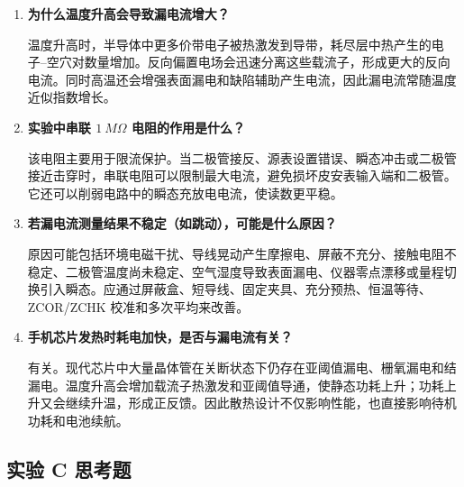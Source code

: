 \documentclass[11pt]{article}
\begin{document}
\begin{enumerate}
    \item \textbf{为什么温度升高会导致漏电流增大？}

    温度升高时，半导体中更多价带电子被热激发到导带，耗尽层中热产生的电子--空穴对数量增加。反向偏置电场会迅速分离这些载流子，形成更大的反向电流。同时高温还会增强表面漏电和缺陷辅助产生电流，因此漏电流常随温度近似指数增长。

    \item \textbf{实验中串联 $\SI{1}{M\Omega}$ 电阻的作用是什么？}

    该电阻主要用于限流保护。当二极管接反、源表设置错误、瞬态冲击或二极管接近击穿时，串联电阻可以限制最大电流，避免损坏皮安表输入端和二极管。它还可以削弱电路中的瞬态充放电电流，使读数更平稳。

    \item \textbf{若漏电流测量结果不稳定（如跳动），可能是什么原因？}

    原因可能包括环境电磁干扰、导线晃动产生摩擦电、屏蔽不充分、接触电阻不稳定、二极管温度尚未稳定、空气湿度导致表面漏电、仪器零点漂移或量程切换引入瞬态。应通过屏蔽盒、短导线、固定夹具、充分预热、恒温等待、ZCOR/ZCHK 校准和多次平均来改善。

    \item \textbf{手机芯片发热时耗电加快，是否与漏电流有关？}

    有关。现代芯片中大量晶体管在关断状态下仍存在亚阈值漏电、栅氧漏电和结漏电。温度升高会增加载流子热激发和亚阈值导通，使静态功耗上升；功耗上升又会继续升温，形成正反馈。因此散热设计不仅影响性能，也直接影响待机功耗和电池续航。
\end{enumerate}

\subsection{实验 C 思考题}
\end{document}
